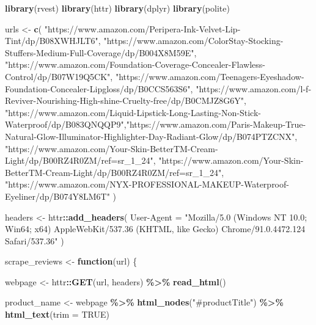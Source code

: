 \documentclass[
  11pt,
]{article}
\newenvironment{Shaded}{\begin{snugshade}}{\end{snugshade}}
\newcommand{\AttributeTok}[1]{\textcolor[rgb]{0.13,0.29,0.53}{#1}}
\newcommand{\ConstantTok}[1]{\textcolor[rgb]{0.56,0.35,0.01}{#1}}
\newcommand{\ControlFlowTok}[1]{\textcolor[rgb]{0.13,0.29,0.53}{\textbf{#1}}}
\newcommand{\FunctionTok}[1]{\textcolor[rgb]{0.13,0.29,0.53}{\textbf{#1}}}
\newcommand{\NormalTok}[1]{#1}
\newcommand{\OtherTok}[1]{\textcolor[rgb]{0.56,0.35,0.01}{#1}}
\newcommand{\SpecialCharTok}[1]{\textcolor[rgb]{0.81,0.36,0.00}{\textbf{#1}}}
\newcommand{\StringTok}[1]{\textcolor[rgb]{0.31,0.60,0.02}{#1}}
\begin{document}
\begin{Shaded}
\begin{Highlighting}[]
\FunctionTok{library}\NormalTok{(rvest)}
\FunctionTok{library}\NormalTok{(httr)}
\FunctionTok{library}\NormalTok{(dplyr)}
\FunctionTok{library}\NormalTok{(polite)}

\NormalTok{urls }\OtherTok{\textless{}{-}} \FunctionTok{c}\NormalTok{(}
  \StringTok{"https://www.amazon.com/Peripera{-}Ink{-}Velvet{-}Lip{-}Tint/dp/B08XWHJLT6"}\NormalTok{,}
  \StringTok{"https://www.amazon.com/ColorStay{-}Stocking{-}Stuffers{-}Medium{-}Full{-}Coverage/dp/B004X8M59E"}\NormalTok{,}
  \StringTok{"https://www.amazon.com/Foundation{-}Coverage{-}Concealer{-}Flawless{-}Control/dp/B07W19Q5CK"}\NormalTok{,}
  \StringTok{"https://www.amazon.com/Teenagers{-}Eyeshadow{-}Foundation{-}Concealer{-}Lipgloss/dp/B0CCS563S6"}\NormalTok{,}
  \StringTok{"https://www.amazon.com/l{-}f{-}Reviver{-}Nourishing{-}High{-}shine{-}Cruelty{-}free/dp/B0CMJZ8G6Y"}\NormalTok{,}
  \StringTok{"https://www.amazon.com/Liquid{-}Lipstick{-}Long{-}Lasting{-}Non{-}Stick{-}Waterproof/dp/B083QNQQP9"}\NormalTok{,}\StringTok{"https://www.amazon.com/Paris{-}Makeup{-}True{-}Natural{-}Glow{-}Illuminator{-}Highlighter{-}Day{-}Radiant{-}Glow/dp/B074PTZCNX"}\NormalTok{, }\StringTok{"https://www.amazon.com/Your{-}Skin{-}BetterTM{-}Cream{-}Light/dp/B00RZ4R0ZM/ref=sr\_1\_24"}\NormalTok{, }\StringTok{"https://www.amazon.com/Your{-}Skin{-}BetterTM{-}Cream{-}Light/dp/B00RZ4R0ZM/ref=sr\_1\_24"}\NormalTok{, }\StringTok{"https://www.amazon.com/NYX{-}PROFESSIONAL{-}MAKEUP{-}Waterproof{-}Eyeliner/dp/B074Y8LM6T"}
\NormalTok{)}


\NormalTok{headers }\OtherTok{\textless{}{-}}\NormalTok{ httr}\SpecialCharTok{::}\FunctionTok{add\_headers}\NormalTok{(}
  \StringTok{\textasciigrave{}}\AttributeTok{User{-}Agent}\StringTok{\textasciigrave{}} \OtherTok{=} \StringTok{"Mozilla/5.0 (Windows NT 10.0; Win64; x64) AppleWebKit/537.36 (KHTML, like Gecko) Chrome/91.0.4472.124 Safari/537.36"}
\NormalTok{)}


\NormalTok{scrape\_reviews }\OtherTok{\textless{}{-}} \ControlFlowTok{function}\NormalTok{(url) \{}
  
\NormalTok{  webpage }\OtherTok{\textless{}{-}}\NormalTok{ httr}\SpecialCharTok{::}\FunctionTok{GET}\NormalTok{(url, headers) }\SpecialCharTok{\%\textgreater{}\%} \FunctionTok{read\_html}\NormalTok{()}

\NormalTok{  product\_name }\OtherTok{\textless{}{-}}\NormalTok{ webpage }\SpecialCharTok{\%\textgreater{}\%}
    \FunctionTok{html\_nodes}\NormalTok{(}\StringTok{"\#productTitle"}\NormalTok{) }\SpecialCharTok{\%\textgreater{}\%}
    \FunctionTok{html\_text}\NormalTok{(}\AttributeTok{trim =} \ConstantTok{TRUE}\NormalTok{)}
  

\end{Highlighting}
\end{Shaded}
\end{document}
